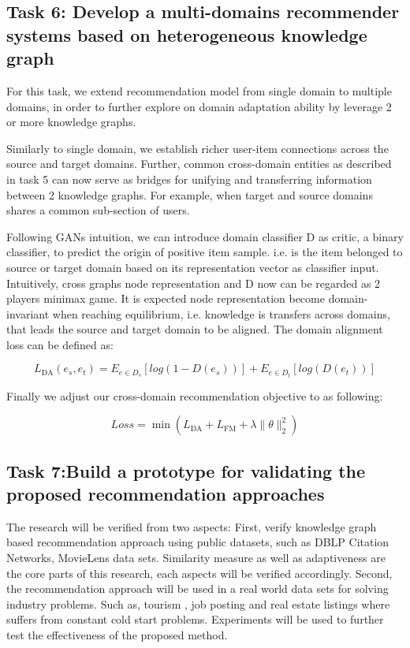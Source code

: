 \subsection*{Task 6: Develop a multi-domains recommender systems based on heterogeneous knowledge graph}

For this task, we extend recommendation model from single domain to multiple domains, in order to further explore on domain adaptation ability by leverage 2 or more knowledge graphs.

Similarly to single domain, we establish richer user-item connections across the source and target domains. Further, common cross-domain entities as described in task 5 can now serve as bridges for unifying and transferring information between 2 knowledge graphs.
For example, when target and source domains shares a common sub-section of users.

Following GANs intuition, we can introduce domain classifier D as critic, a binary classifier, to predict the origin of positive item sample. i.e. is the item belonged to source or target domain based on its representation vector as classifier input. Intuitively, cross graphs node representation and D now can be regarded as 2 players minimax game. It is expected node representation become domain-invariant when reaching equilibrium, i.e. knowledge is transfers across domains, that leads the source and target domain to be aligned. The domain alignment loss can be defined as:

\begin{equation}
    L_\text{DA}(e_s,e_t)=E_{e \in D_s}[log(1-D(e_s))] + E_{e \in D_t}[log(D(e_t))]
\end{equation}

Finally we adjust our cross-domain recommendation objective to as following:

\begin{equation}
    Loss=\min{(L_\text{DA}+L_\text{FM}+\lambda\|\theta\|^2_2)}
\end{equation}



\subsection*{Task 7:Build a prototype for validating the proposed recommendation approaches}

The research will be verified from two aspects:
First, verify knowledge graph based recommendation approach using public datasets, such as DBLP Citation Networks, MovieLens data sets. Similarity measure as well as adaptiveness are the core parts of this research, each aspects will be verified accordingly.
Second, the recommendation approach will be used in a real world data sets for solving industry problems. Such as, tourism , job posting and real estate listings where suffers from constant cold start problems. Experiments will be used to further test the effectiveness of the proposed method.

